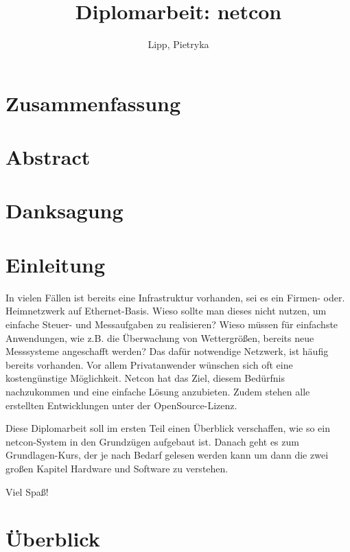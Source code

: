 \documentclass[a4paper,14pt,headsepline]{scrartcl}
\begin{document}
\author{Lipp, Pietryka} 
\title{Diplomarbeit: netcon} 
\date{} 
\maketitle

\newpage

\section*{Zusammenfassung}
\newpage

\section*{Abstract}
\newpage

\section*{Danksagung}
\newpage

\section*{Einleitung}
In vielen Fällen ist bereits eine Infrastruktur vorhanden, sei es ein Firmen- oder. Heimnetzwerk auf Ethernet-Basis. Wieso sollte man dieses nicht nutzen, um einfache Steuer- und Messaufgaben zu realisieren? Wieso müssen für einfachste Anwendungen, wie z.B. die Überwachung von Wettergrößen, bereits neue Messsysteme angeschafft werden? Das dafür notwendige Netzwerk, ist häufig bereits vorhanden. Vor allem Privatanwender wünschen sich oft eine kostengünstige Möglichkeit. Netcon hat das Ziel, diesem Bedürfnis nachzukommen und eine einfache Lösung anzubieten. Zudem stehen alle erstellten Entwicklungen unter der OpenSource-Lizenz. 

Diese Diplomarbeit soll im ersten Teil einen Überblick verschaffen, wie so ein netcon-System in den Grundzügen aufgebaut ist. Danach geht es zum Grundlagen-Kurs, der je nach Bedarf gelesen werden kann um dann die zwei großen Kapitel Hardware und Software zu verstehen.

Viel Spaß!

\newpage

\tableofcontents
\newpage


\section{Überblick}
\end{document}
